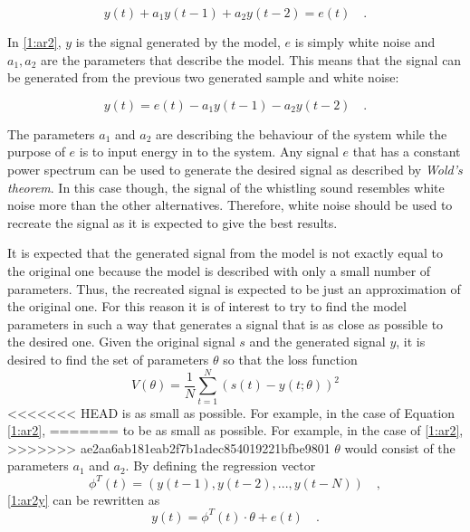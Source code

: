 \documentclass{IEEEtran}
\begin{document}
\begin{equation}
  \label{1:ar2}
  y(t) + a_1 y(t-1) + a_2 y(t-2) = e(t) \quad .
\end{equation}

In \eqref{1:ar2}, $y$ is the signal generated by the model, $e$ is
simply white noise and $a_1, a_2$ are the parameters that describe the
model. This means that the signal can be generated from the previous two
generated sample and white noise:

\begin{equation}
  \label{1:ar2y}
  y(t) = e(t) - a_1 y(t-1) - a_2 y(t-2)\quad .
\end{equation}

The parameters $a_1$ and $a_2$ are describing the behaviour of the system
while the purpose of $e$ is to input energy in to the system. Any signal
$e$ that has a constant power spectrum can be used to generate the desired
signal as described by \textit{Wold's theorem}\cite{signalproc}. In this
case though, the signal of the whistling sound resembles white noise more
than the other alternatives. Therefore, white noise should be used to
recreate the signal as it is expected to give the best results.

It is expected that the generated signal from the model is not exactly
equal to the original one because the model is described with only a small
number of parameters. Thus, the recreated signal is expected to be just an
approximation of the original one. For this reason it is of interest to
try to find the model parameters in such a way that generates a signal
that is as close as possible to the desired one. Given the original signal
$s$ and the generated signal $y$, it is desired to find the set of
parameters $\theta$ so that the loss function
\begin{equation}
  \label{1:loss}
  V(\theta)  = \frac{1}{N}\sum_{t=1}^{N}(s(t) - y(t; \theta))^2
\end{equation}
<<<<<<< HEAD
is as small as possible. For example, in the case of Equation \ref{1:ar2},
=======
to be as small as possible. For example, in the case of \eqref{1:ar2},
>>>>>>> ae2aa6ab181eab2f7b1adec854019221bfbe9801
$\theta$ would consist of the parameters $a_1$ and $a_2$. By defining
the regression vector
\begin{equation*}
  \phi^T(t) = (y(t-1), y(t-2), ... , y(t-N)) \quad ,
\end{equation*}
\eqref{1:ar2y} can be rewritten as
\begin{equation*}
  y(t) = \phi^T(t)\cdot\theta + e(t) \quad .
\end{equation*}
\end{document}

